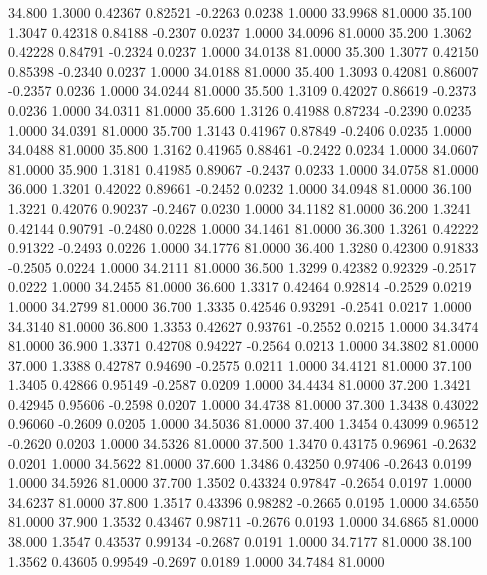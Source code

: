   34.800   1.3000   0.42367   0.82521  -0.2263   0.0238   1.0000  33.9968  81.0000
  35.100   1.3047   0.42318   0.84188  -0.2307   0.0237   1.0000  34.0096  81.0000
  35.200   1.3062   0.42228   0.84791  -0.2324   0.0237   1.0000  34.0138  81.0000
  35.300   1.3077   0.42150   0.85398  -0.2340   0.0237   1.0000  34.0188  81.0000
  35.400   1.3093   0.42081   0.86007  -0.2357   0.0236   1.0000  34.0244  81.0000
  35.500   1.3109   0.42027   0.86619  -0.2373   0.0236   1.0000  34.0311  81.0000
  35.600   1.3126   0.41988   0.87234  -0.2390   0.0235   1.0000  34.0391  81.0000
  35.700   1.3143   0.41967   0.87849  -0.2406   0.0235   1.0000  34.0488  81.0000
  35.800   1.3162   0.41965   0.88461  -0.2422   0.0234   1.0000  34.0607  81.0000
  35.900   1.3181   0.41985   0.89067  -0.2437   0.0233   1.0000  34.0758  81.0000
  36.000   1.3201   0.42022   0.89661  -0.2452   0.0232   1.0000  34.0948  81.0000
  36.100   1.3221   0.42076   0.90237  -0.2467   0.0230   1.0000  34.1182  81.0000
  36.200   1.3241   0.42144   0.90791  -0.2480   0.0228   1.0000  34.1461  81.0000
  36.300   1.3261   0.42222   0.91322  -0.2493   0.0226   1.0000  34.1776  81.0000
  36.400   1.3280   0.42300   0.91833  -0.2505   0.0224   1.0000  34.2111  81.0000
  36.500   1.3299   0.42382   0.92329  -0.2517   0.0222   1.0000  34.2455  81.0000
  36.600   1.3317   0.42464   0.92814  -0.2529   0.0219   1.0000  34.2799  81.0000
  36.700   1.3335   0.42546   0.93291  -0.2541   0.0217   1.0000  34.3140  81.0000
  36.800   1.3353   0.42627   0.93761  -0.2552   0.0215   1.0000  34.3474  81.0000
  36.900   1.3371   0.42708   0.94227  -0.2564   0.0213   1.0000  34.3802  81.0000
  37.000   1.3388   0.42787   0.94690  -0.2575   0.0211   1.0000  34.4121  81.0000
  37.100   1.3405   0.42866   0.95149  -0.2587   0.0209   1.0000  34.4434  81.0000
  37.200   1.3421   0.42945   0.95606  -0.2598   0.0207   1.0000  34.4738  81.0000
  37.300   1.3438   0.43022   0.96060  -0.2609   0.0205   1.0000  34.5036  81.0000
  37.400   1.3454   0.43099   0.96512  -0.2620   0.0203   1.0000  34.5326  81.0000
  37.500   1.3470   0.43175   0.96961  -0.2632   0.0201   1.0000  34.5622  81.0000
  37.600   1.3486   0.43250   0.97406  -0.2643   0.0199   1.0000  34.5926  81.0000
  37.700   1.3502   0.43324   0.97847  -0.2654   0.0197   1.0000  34.6237  81.0000
  37.800   1.3517   0.43396   0.98282  -0.2665   0.0195   1.0000  34.6550  81.0000
  37.900   1.3532   0.43467   0.98711  -0.2676   0.0193   1.0000  34.6865  81.0000
  38.000   1.3547   0.43537   0.99134  -0.2687   0.0191   1.0000  34.7177  81.0000
  38.100   1.3562   0.43605   0.99549  -0.2697   0.0189   1.0000  34.7484  81.0000
